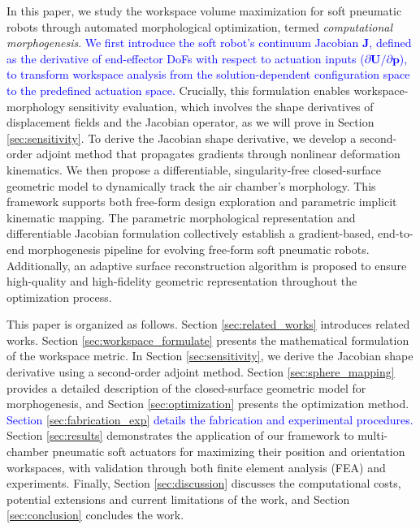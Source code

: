 \documentclass[journal]{IEEEtran}
\theoremstyle{definition}
\begin{document}
In this paper, we study the workspace volume maximization for soft pneumatic robots through automated morphological optimization, termed \textit{computational morphogenesis}. \textcolor{blue}{We first introduce the soft robot's continuum Jacobian $\mathbf{J}$, defined as the derivative of end-effector DoFs with respect to actuation inputs ($\partial \mathbf{U}/\partial \mathbf{p}$), to transform workspace analysis from the solution-dependent configuration space to the predefined actuation space.} Crucially, this formulation enables workspace-morphology sensitivity evaluation, which involves the shape derivatives of displacement fields and the Jacobian operator, as we will prove in Section \ref{sec:sensitivity}. To derive the Jacobian shape derivative, we develop a second-order adjoint method that propagates gradients through nonlinear deformation kinematics. We then propose a differentiable, singularity-free closed-surface geometric model to dynamically track the air chamber's morphology. This framework supports both free-form design exploration and parametric implicit kinematic mapping. The parametric morphological representation and differentiable Jacobian formulation collectively establish a gradient-based, end-to-end morphogenesis pipeline for evolving free-form soft pneumatic robots. Additionally, an adaptive surface reconstruction algorithm is proposed to ensure high-quality and high-fidelity geometric representation throughout the optimization process.

This paper is organized as follows. Section \ref{sec:related_works} introduces related works. Section \ref{sec:workspace_formulate} presents the mathematical formulation of the workspace metric. In Section \ref{sec:sensitivity}, we derive the Jacobian shape derivative using a second-order adjoint method. Section \ref{sec:sphere_mapping} provides a detailed description of the closed-surface geometric model for morphogenesis, and Section \ref{sec:optimization} presents the optimization method. 
\textcolor{blue}{Section \ref{sec:fabrication_exp} details the fabrication and experimental procedures.}
Section \ref{sec:results} demonstrates the application of our framework to multi-chamber pneumatic soft actuators for maximizing their position and orientation workspaces, with validation through both finite element analysis (FEA) and experiments. 
Finally, Section \ref{sec:discussion} discusses the computational costs, potential extensions and current limitations of the work, and Section \ref{sec:conclusion} concludes the work.
\end{document}
